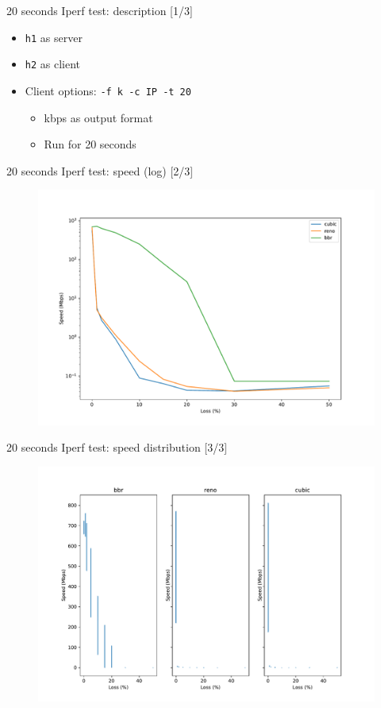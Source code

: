 \documentclass[13pt,aspectratio=43]{beamer}
\begin{document}
\begin{frame}{20 seconds Iperf test: description [1/3]}
	\begin{itemize}
		\item \texttt{h1} as server
		\item \texttt{h2} as client
		\item Client options: \texttt{-f k -c IP -t 20 }
			\begin{itemize}
				\item[-f k] kbps as output format
				\item[-t 20] Run for 20 seconds
			\end{itemize}
	\end{itemize}
\end{frame}

\begin{frame}{20 seconds Iperf test: speed (log) [2/3]}
  \begin{figure}
	  \includegraphics[width=\textwidth,height=\textheight,keepaspectratio]{../iperf_test/plot_log.pdf}
  \end{figure}
\end{frame}

\begin{frame}{20 seconds Iperf test: speed distribution [3/3]}
  \begin{figure}
	  \includegraphics[width=\textwidth,height=\textheight,keepaspectratio]{../iperf_test/violinplot.pdf}
  \end{figure}
\end{frame}
\end{document}
